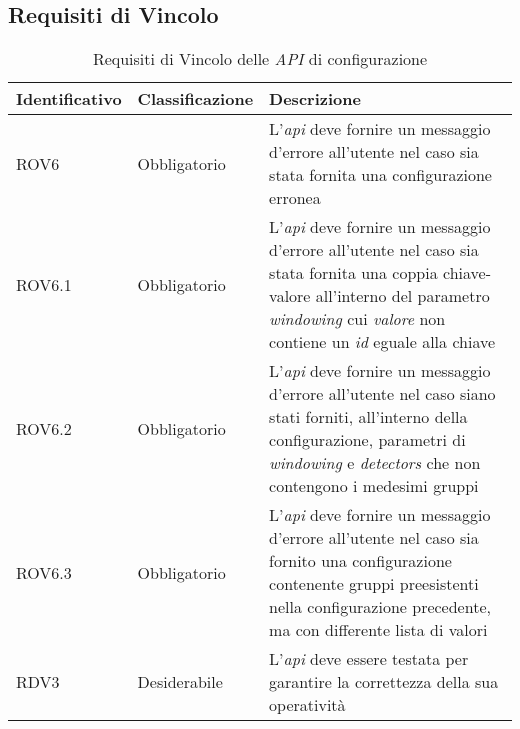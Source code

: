 \subsection{Requisiti di Vincolo}
{
\centering
\begin{longtable}{L{3cm} L{3cm} L{7.5cm}}
\caption{Requisiti di Vincolo delle \textit{API} di configurazione}\\
\textbf{Identificativo} &
\textbf{Classificazione}&
\textbf{Descrizione}\\
\endhead
\hline
ROV6 & Obbligatorio & L'\textit{\gls{api}} deve fornire un messaggio d'errore all'utente nel caso sia stata fornita una configurazione erronea\\
\hline
ROV6.1 & Obbligatorio & L'\textit{\gls{api}} deve fornire un messaggio d'errore all'utente nel caso sia stata fornita una coppia chiave-valore all'interno del parametro \textit{windowing} cui \textit{valore} non contiene un \textit{id} eguale alla chiave\\
\hline
ROV6.2 & Obbligatorio & L'\textit{\gls{api}} deve fornire un messaggio d'errore all'utente nel caso siano stati forniti, all'interno della configurazione, parametri di \textit{windowing} e \textit{detectors} che non contengono i medesimi gruppi\\
\hline
ROV6.3 & Obbligatorio & L'\textit{\gls{api}} deve fornire un messaggio d'errore all'utente nel caso sia fornito una configurazione contenente gruppi preesistenti nella configurazione precedente, ma con differente lista di valori\\
\hline
RDV3 & Desiderabile & L'\textit{\gls{api}} deve essere testata per garantire la correttezza della sua operatività\\
\hline
\end{longtable}
}


